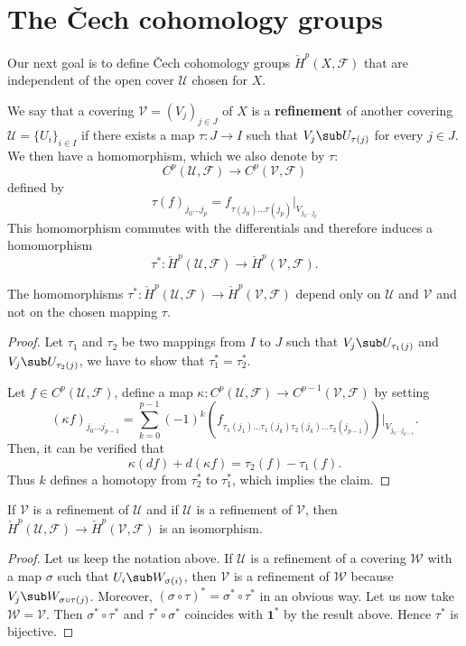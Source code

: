 \section{The \v{C}ech cohomology groups}
Our next goal is to define \v{C}ech cohomology groups $\check{H}^p(X,\mathscr{F})$ that are independent of the open cover $\mathcal{U}$ chosen for $X$.\par
We say that a covering $\mathcal{V}=(V_j)_{j\in J}$ of $X$ is a \textbf{refinement} of another covering $\mathcal{U}=\{U_i\}_{i\in I}$ if there exists a map $\tau:J\to I$ such that $V_j\sub U_{\tau(j)}$ for every $j\in J$. We then have a homomorphism, which we also denote by $\tau$:
\[C^p(\mathcal{U},\mathscr{F})\to C^p(\mathcal{V},\mathscr{F})\]
defined by
\[\tau(f)_{j_0\dots j_p}=f_{\tau(j_0)\dots\tau(j_p)}|_{V_{j_0\dots j_p}}\]
This homomorphism commutes with the differentials and therefore induces a
homomorphism
\[\tau^*:\check{H}^p(\mathcal{U},\mathscr{F})\to\check{H}^p(\mathcal{V},\mathscr{F}).\]
\begin{proposition}\label{Cech refinement map}
The homomorphisms $\tau^*:\check{H}^p(\mathcal{U},\mathscr{F})\to\check{H}^p(\mathcal{V},\mathscr{F})$ depend only on $\mathcal{U}$ and $\mathcal{V}$ and not on the chosen mapping $\tau$.
\end{proposition}
\begin{proof}
Let $\tau_1$ and $\tau_2$ be two mappings from $I$ to $J$ such that $V_j\sub U_{\tau_1(j)}$ and $V_j\sub U_{\tau_2(j)}$, we have to show that $\tau_1^*=\tau_2^*$.\par
Let $f\in C^p(\mathcal{U},\mathscr{F})$, define a map $\kappa:C^p(\mathcal{U},\mathscr{F})\to C^{p-1}(\mathcal{V},\mathscr{F})$ by setting
\[(\kappa f)_{j_0\dots j_{p-1}}=\sum_{k=0}^{p-1}(-1)^k(f_{\tau_1(j_1)\dots\tau_1(j_k)\tau_2(j_k)\dots\tau_2(j_{p-1})})|_{V_{j_0\dots j_{p-1}}}.\]
Then, it can be verified that
\[\kappa(df)+d(\kappa f)=\tau_2(f)-\tau_1(f).\]
Thus $k$ defines a homotopy from $\tau_2^*$ to $\tau_1^*$, which implies the claim.
\end{proof}
\begin{corollary}
If $\mathcal{V}$ is a refinement of $\mathcal{U}$ and if $\mathcal{U}$ is a refinement of $\mathcal{V}$, then $\check{H}^p(\mathcal{U},\mathscr{F})\to\check{H}^p(\mathcal{V},\mathscr{F})$ is an isomorphism.
\end{corollary}
\begin{proof}
Let us keep the notation above. If $\mathcal{U}$ is a refinement of a covering $\mathcal{W}$ with a map $\sigma$ such that $U_i\sub W_{\sigma(i)}$, then $\mathcal{V}$ is a refinement of $\mathcal{W}$ because $V_j\sub W_{\sigma\circ\tau(j)}$. Moreover, $(\sigma\circ\tau)^*=\sigma^*\circ\tau^*$ in an obvious way. Let us now take $\mathcal{W}=\mathcal{V}$. Then $\sigma^*\circ\tau^*$ and $\tau^*\circ\sigma^*$ coincides with $\mathbf{1}^*$ by the result above. Hence $\tau^*$ is bijective.
\end{proof}
